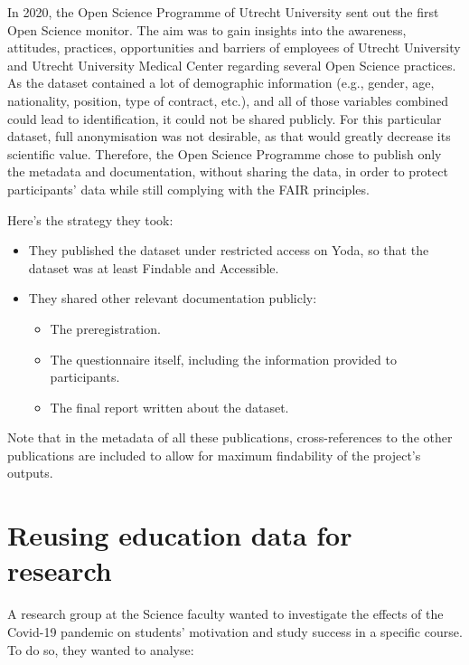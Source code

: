\documentclass[
]{book}
\providecommand{\tightlist}{%
  \setlength{\itemsep}{0pt}\setlength{\parskip}{0pt}}
\begin{document}
In 2020, the
Open
Science Programme of Utrecht University sent out the first
Open Science monitor. The aim was to gain insights into the awareness,
attitudes, practices, opportunities and barriers of employees of Utrecht
University and Utrecht University Medical Center regarding several Open
Science practices. As the dataset contained a lot of demographic information
(e.g., gender, age, nationality, position, type of contract, etc.), and all of
those variables combined could lead to identification, it could not be shared
publicly. For this particular dataset, full anonymisation was not desirable,
as that would greatly decrease its scientific value. Therefore, the Open Science
Programme chose to publish only the metadata and documentation, without sharing
the data, in order to protect participants' data while still complying with the
FAIR principles.

Here's the strategy they took:

\begin{itemize}
\tightlist
\item
  They published the dataset under
  restricted
  access on Yoda, so that the dataset was at least Findable and Accessible.
\item
  They shared other relevant documentation publicly:

  \begin{itemize}
  \tightlist
  \item
    The preregistration.
  \item
    The questionnaire itself,
    including the information provided to participants.
  \item
    The final report
    written about the dataset.
  \end{itemize}
\end{itemize}

Note that in the metadata of all these publications, cross-references to the
other publications are included to allow for maximum findability of the
project's outputs.

\hypertarget{reuse-education-data}{%
\chapter{Reusing education data for research}\label{reuse-education-data}}

A research group at the Science faculty wanted to investigate the effects of the
Covid-19 pandemic on students' motivation and study success in a specific course.
To do so, they wanted to analyse:
\end{document}
